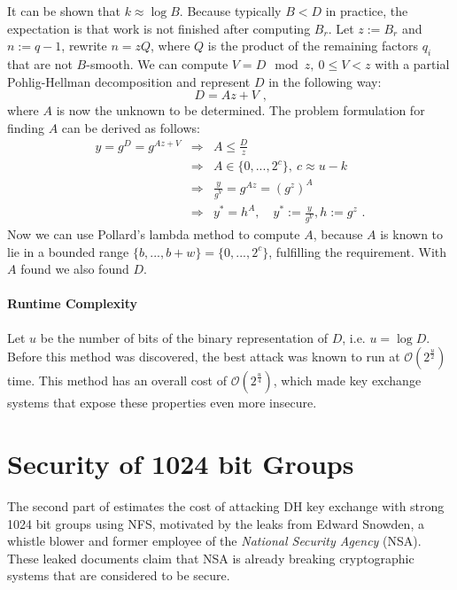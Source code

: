 \documentclass[paper=a4, fontsize=11pt]{scrartcl} %
\numberwithin{equation}{section} %
\numberwithin{figure}{section} %
\numberwithin{table}{section} %
\begin{document}
It can be shown that $k \approx \log B$. Because typically $B < D$ in practice, the expectation is that work is not finished after computing $B_r$. Let $z:=B_r$ and $n:=q-1$, rewrite $n=zQ$, where $Q$ is the product of the remaining factors $q_i$ that are not $B$-smooth. We can compute $V = D \mod z,\ 0\leq V<z$ with a partial Pohlig-Hellman decomposition and represent $D$ in the following way:
\begin{equation}
D = Az + V
\text{ ,}
\end{equation}
where $A$ is now the unknown to be determined. The problem formulation for finding $A$ can be derived as follows:
\begin{equation}
\begin{array}{lcl}
y=g^D=g^{Az+V} & \Rightarrow & A \leq \frac{D}{z}\\
& \Rightarrow & A\in\{0,...,2^c\},\ c\approx u-k\\
& \Rightarrow & \frac{y}{g^V} = g^{Az} = (g^z)^A\\
& \Rightarrow & y^* = h^A,\quad y^* := \frac{y}{g^V}, h := g^z
\text{ .}
\end{array}
\end{equation}
Now we can use Pollard's lambda method to compute $A$, because $A$ is known to lie in a bounded range $\{b,...,b+w\} = \{0,...,2^c\}$, fulfilling the requirement. With $A$ found we also found $D$.

\paragraph{Runtime Complexity} Let $u$ be the number of bits of the binary representation of $D$, i.e. $u = \log D$. Before this method was discovered, the best attack was known to run at $\mathcal{O}(2^{\frac{u}{2}})$ time. This method has an overall cost of $\mathcal{O}(2^{\frac{u}{4}})$, which made key exchange systems that expose these properties even more insecure.

\section{Security of 1024 bit Groups}
The second part of \citep{Adrian:2015:IFS:2810103.2813707} estimates the cost of attacking DH key exchange with strong 1024 bit groups using NFS, motivated by the leaks from Edward Snowden, a whistle blower and former employee of the \textit{National Security Agency} (NSA). These leaked documents claim that NSA is already breaking cryptographic systems that are considered to be secure.
\end{document}

